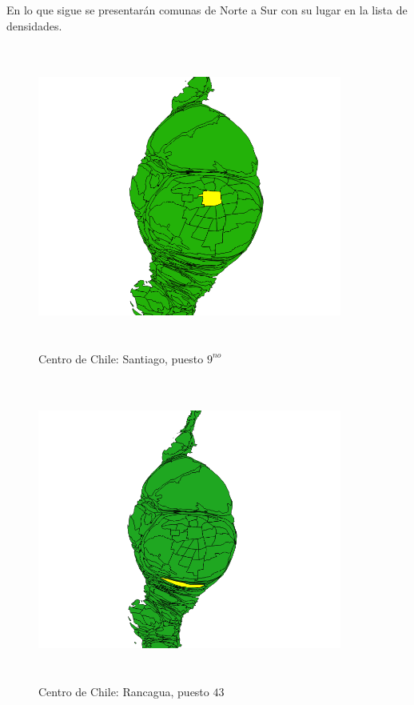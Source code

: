 \documentclass[20pt]{report}
\begin{document}
\begin{itemize}
En lo que sigue se presentar\'an comunas de Norte a Sur con su lugar en la lista de densidades.

\begin{figure}[H]
\begin{center}
\includegraphics[width=10cm, height=10cm]{santiago9.png}
\vspace{-0.5cm} %
\caption{Centro de Chile: Santiago, puesto $9^{no}$}
\label{Label para referencia}
\end{center}
\end{figure}

\begin{figure}[H]
\begin{center}
\includegraphics[width=10cm, height=10cm]{rancagua.png}
\vspace{-0.5cm} %
\caption{Centro de Chile: Rancagua, puesto $43$}
\label{Label para referencia}
\end{center}
\end{figure}


\end{itemize}
\end{document}
